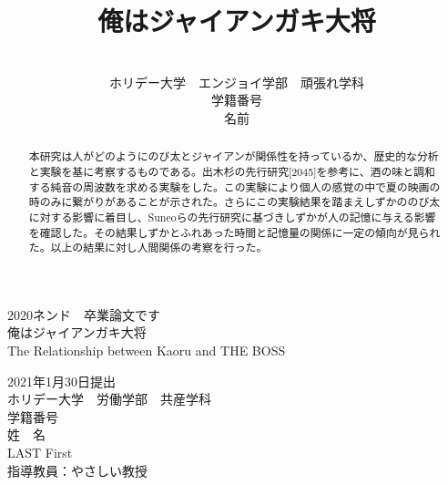 \documentclass[uplatex,a4paper,10.5pt]{jsreport}
\title{ \Large 俺はジャイアンガキ大将}
\author{\\ホリデー大学　エンジョイ学部　頑張れ学科\\学籍番号\\名前}
\date{}
\begin{document}
\begin{titlepage}

\begin{center}
\vspace*{100truept}
{\Large 2020ネンド　卒業論文です}\\
\vspace{50truept}
{\huge 俺はジャイアンガキ大将}\\ %
\vspace{10truept}
{\large The Relationship between Kaoru and THE BOSS}\\ %
\vspace{60truept}

{\Large 2021年1月30日提出}\\ %
\vspace{60truept}
{\Large ホリデー大学　労働学部　共産学科}\\
{\Large 学籍番号}\\
{\Large 姓　名}\\ %
{\Large LAST First}\\ %

\vspace{60truept}
{\large
指導教員：やさしい教授\\
}
\end{center}

\end{titlepage}


\begin{abstract}
本研究は人がどのようにのび太とジャイアンが関係性を持っているか、歴史的な分析と実験を基に考察するものである。出木杉の先行研究[2045]を参考に、酒の味と調和する純音の周波数を求める実験をした。この実験により個人の感覚の中で夏の映画の時のみに繋がりがあることが示された。さらにこの実験結果を踏まえしずかののび太に対する影響に着目し、Suneoらの先行研究に基づきしずかが人の記憶に与える影響を確認した。その結果しずかとふれあった時間と記憶量の関係に一定の傾向が見られた。以上の結果に対し人間関係の考察を行った。
\end{abstract}
\end{document}
